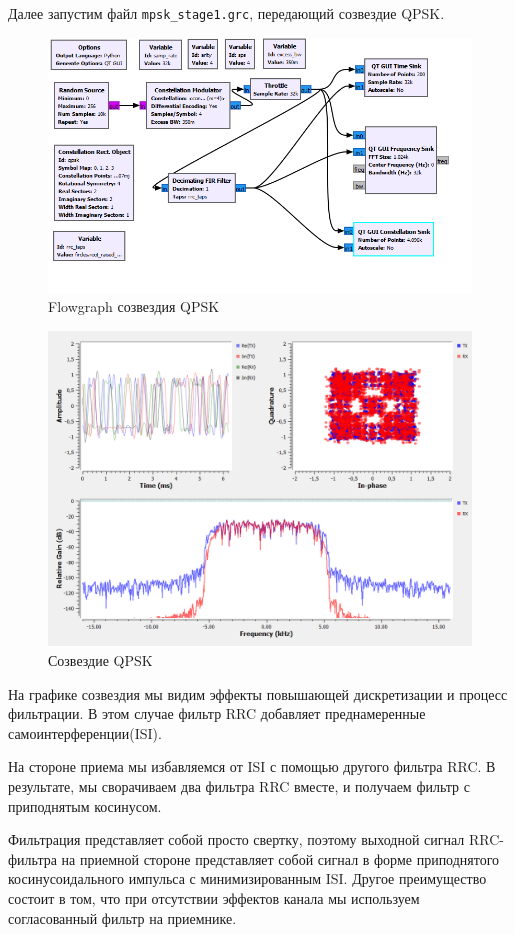 \documentclass[a4paper, 14pt]{extarticle}
\begin{document}
    Далее запустим файл \texttt{mpsk\_stage1.grc}, передающий созвездие QPSK.

    \begin{figure}[H]
        \centering
        \includegraphics[width=0.8\linewidth]{flowgraps_qpsk_constellation}
        \caption{Flowgraph созвездия QPSK}
        \label{fig:flowgraps_qpsk_constellation}
    \end{figure}

    \begin{figure}[H]
        \centering
        \includegraphics[width=0.8\linewidth]{qpsk_constellation}
        \caption{Созвездие QPSK}
        \label{fig:qpsk_constellation}
    \end{figure}

    На графике созвездия мы видим эффекты повышающей дискретизации и процесс фильтрации.
    В этом случае фильтр RRC добавляет преднамеренные самоинтерференции(ISI).

    На стороне приема мы избавляемся от ISI с помощью другого фильтра RRC.
    В результате, мы сворачиваем два фильтра RRC вместе, и получаем фильтр с приподнятым косинусом.

    Фильтрация представляет собой просто свертку, поэтому выходной сигнал RRC-фильтра на приемной стороне представляет собой сигнал в форме приподнятого косинусоидального импульса с минимизированным ISI.
    Другое преимущество состоит в том, что при отсутствии эффектов канала мы используем согласованный фильтр на приемнике.
\end{document}
